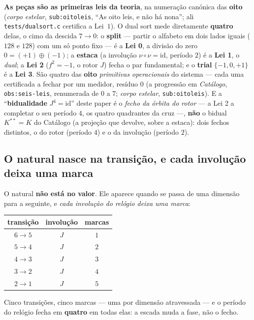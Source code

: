 \documentclass[11pt,a4paper]{article}
\newcommand{\code}[1]{\texttt{\small #1}}
\begin{document}
\smallskip
\noindent \textbf{As peças são as primeiras leis da teoria}, na numeração canónica das \textbf{oito}
(\emph{corpo estelar}, \code{sub:oitoleis}, ``As oito leis, e não há nona''; ali \code{tests/dualsort.c}
certifica a Lei~$1$). O dual sort mede diretamente \textbf{quatro} delas, o cimo da descida $7\to0$: o
\textbf{split} --- partir o alfabeto em dois lados iguais ($128$ e $128$) com um só ponto fixo --- é a
\textbf{Lei 0}, a divisão do zero $0=(+1)\oplus(-1)$; a \textbf{estaca} (a involução
$\nu\circ\nu=\mathrm{id}$, período $2$) é a \textbf{Lei 1}, o \emph{dual}; a \textbf{Lei 2}
($f^{2}=-1$, o rotor $J$) fecha o par fundamental; e o \textbf{trial} $\{-1,0,+1\}$ é a \textbf{Lei 3}.
São quatro das \textbf{oito} \emph{primitivas operacionais} do sistema --- cada uma certificada a fechar
por um medidor, resíduo $0$ (a progressão em \emph{Catálogo}, \code{obs:seis-leis}, renumerada de $0$ a
$7$; \emph{corpo estelar}, \code{sub:oitoleis}). E a ``\textbf{bidualidade}
$J^{4}=\mathrm{id}$'' deste paper é o \emph{fecho da órbita do rotor} --- a Lei 2 a completar o seu
período $4$, os quatro quadrantes da cruz ---, \textbf{não} o bidual $K^{**}=K$ do Catálogo (a projeção
que devolve, sobre a estaca): dois fechos distintos, o do rotor (período $4$) e o da involução
(período $2$).

\subsection*{O natural nasce na transição, e cada involução deixa uma marca}

O natural \textbf{não está no valor}. Ele aparece quando se passa de uma dimensão para a
seguinte, e \emph{cada involução do relógio deixa uma marca}:

\begin{center}\small
\begin{tabular}{@{}ccc@{}}
\toprule
transição & involução & marcas \\
\midrule
$6\to5$ & $J$ & $1$ \\
$5\to4$ & $J$ & $2$ \\
$4\to3$ & $J$ & $3$ \\
$3\to2$ & $J$ & $4$ \\
$2\to1$ & $J$ & $5$ \\
\bottomrule
\end{tabular}
\end{center}

\noindent Cinco transições, cinco marcas --- uma por dimensão atravessada --- e o período do
relógio fecha em \textbf{quatro} em todas elas: a escada muda a fase, não o fecho.
\end{document}
